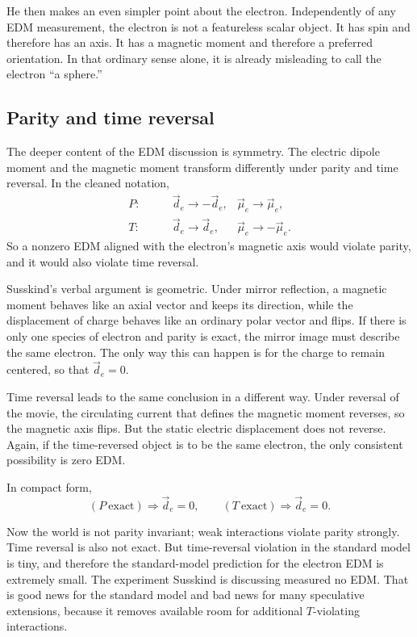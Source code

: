 He then makes an even simpler point about the electron. Independently of any EDM measurement, the electron is not a featureless scalar object. It has spin and therefore has an axis. It has a magnetic moment and therefore a preferred orientation. In that ordinary sense alone, it is already misleading to call the electron ``a sphere.''

\subsection{Parity and time reversal}

The deeper content of the EDM discussion is symmetry. The electric dipole moment and the magnetic moment transform differently under parity and time reversal. In the cleaned notation,
\begin{align}
P:\qquad &\vec d_e \to -\vec d_e,
&\vec \mu_e \to \vec \mu_e,\\
T:\qquad &\vec d_e \to \vec d_e,
&\vec \mu_e \to -\vec \mu_e.
\end{align}
So a nonzero EDM aligned with the electron's magnetic axis would violate parity, and it would also violate time reversal.

Susskind's verbal argument is geometric. Under mirror reflection, a magnetic moment behaves like an axial vector and keeps its direction, while the displacement of charge behaves like an ordinary polar vector and flips. If there is only one species of electron and parity is exact, the mirror image must describe the same electron. The only way this can happen is for the charge to remain centered, so that \(\vec d_e=0\).

Time reversal leads to the same conclusion in a different way. Under reversal of the movie, the circulating current that defines the magnetic moment reverses, so the magnetic axis flips. But the static electric displacement does not reverse. Again, if the time-reversed object is to be the same electron, the only consistent possibility is zero EDM.

In compact form,
\begin{equation}
(P\ \text{exact}) \Rightarrow \vec d_e = 0,
\qquad
(T\ \text{exact}) \Rightarrow \vec d_e = 0.
\end{equation}

Now the world is not parity invariant; weak interactions violate parity strongly. Time reversal is also not exact. But time-reversal violation in the standard model is tiny, and therefore the standard-model prediction for the electron EDM is extremely small. The experiment Susskind is discussing measured no EDM. That is good news for the standard model and bad news for many speculative extensions, because it removes available room for additional \(T\)-violating interactions.

